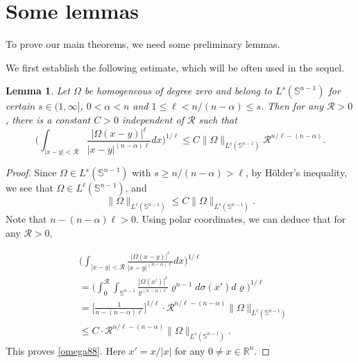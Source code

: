 \documentclass[preprint,10pt]{elsarticle}
\newtheorem{lem}[thm]{Lemma}
\numberwithin{equation}{section}
\begin{document}
\section{Some lemmas}
To prove our main theorems, we need some preliminary lemmas.

We first establish the following estimate, which will be often used in the sequel.
\begin{lem}\label{lem2}
Let $\Omega$ be homogeneous of degree zero and belong to $L^s(\mathbb{S}^{n-1})$ for certain $s\in(1,\infty]$, $0<\alpha<n$ and $1\leq\ell<n/{(n-\alpha)}\leq s$. Then for any $\mathcal{R}>0$, there is a constant $C>0$ independent of $\mathcal{R}$ such that
\begin{equation}\label{omega88}
\bigg(\int_{|x-y|<\mathcal{R}}\frac{|\Omega(x-y)|^{\ell}}{|x-y|^{(n-\alpha)\ell}}dx\bigg)^{1/{\ell}}
\leq C\|\Omega\|_{L^s(\mathbb{S}^{n-1})}\mathcal{R}^{n/{\ell}-(n-\alpha)}.
\end{equation}
\end{lem}

\begin{proof}
Since $\Omega\in L^s(\mathbb{S}^{n-1})$ with $s\geq n/{(n-\alpha)}>\ell$, by H\"{o}lder's inequality, we see that $\Omega\in L^{\ell}(\mathbb{S}^{n-1})$, and
\begin{equation*}
\|\Omega\|_{L^{\ell}(\mathbb{S}^{n-1})}\leq C\|\Omega\|_{L^s(\mathbb{S}^{n-1})}.
\end{equation*}
Note that $n-(n-\alpha)\ell>0$. Using polar coordinates, we can deduce that for any $\mathcal{R}>0$,

\begin{equation*}
\begin{split}
&\bigg(\int_{|x-y|<\mathcal{R}}\frac{|\Omega(x-y)|^{\ell}}{|x-y|^{(n-\alpha)\ell}}dx\bigg)^{1/{\ell}}\\
&=\bigg(\int_{0}^{\mathcal{R}}
\int_{\mathbb{S}^{n-1}}\frac{|\Omega(x')|^{\ell}}{\varrho^{(n-\alpha)\ell}}\varrho^{n-1}d\sigma(x')d\varrho\bigg)^{1/{\ell}}\\
&=\Big[\frac{1}{n-(n-\alpha)\ell}\Big]^{1/{\ell}}\cdot \mathcal{R}^{n/{\ell}-(n-\alpha)}\|\Omega\|_{L^{\ell}(\mathbb{S}^{n-1})}\\
&\leq C\cdot \mathcal{R}^{n/{\ell}-(n-\alpha)}\|\Omega\|_{L^s(\mathbb{S}^{n-1})}.
\end{split}
\end{equation*}
This proves \eqref{omega88}. Here $x'=x/{|x|}$ for any $0\neq x\in \mathbb R^n$.
\end{proof}
\end{document}

